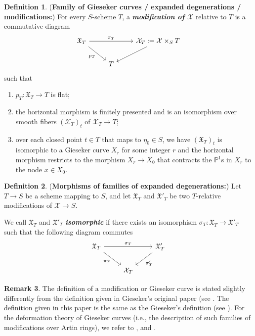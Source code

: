 \documentclass[11pt]{amsart}
\theoremstyle{plain}
\numberwithin{equation}{section}
\theoremstyle{definition}
\newtheorem{Def}{Definition}[section]
\newtheorem{Rem}[Def]{Remark}
\theoremstyle{plain}
\begin{document}
\begin{Def}(\textbf{Family of Gieseker curves / expanded degenerations / modifications:\cite[Definition 3.4]{2a}}) \label{gis120} For every $S$-scheme $T$, a \emph{\bfseries modification of $\mathcal{X}$} relative to $T$  is a commutative diagram
\begin{equation}
\begin{tikzcd}
\mathfrak X_T\arrow{dr}[swap]{p_T}\arrow{rr}{\pi_T}&& \mathcal X_T:=\mathcal X\times_S T\arrow{dl}\\
& T
\end{tikzcd}
\end{equation}
such that
\begin{enumerate}
\item $p_T : \mathfrak X_T \longrightarrow T$ is flat;
\item the horizontal morphism is finitely presented and  is an isomorphism over smooth  fibers $(\mathcal X_T )_t$ of $\mathcal{X}_{T} \to T$;
\item over each closed point $t\in T$ that maps to  $\eta_0\in S$, we have $(\mathfrak X_T)_t$ is isomorphic to a Gieseker curve $X_r$ for some integer $r$ and the horizontal morphism restricts to the morphism $X_{r} \to X_{0}$ that contracts the $\mathbb P^1$s in  $X_r$ to the node $x \in X_{0}$.
\end{enumerate}
\end{Def}

\smallskip

\begin{Def}(\textbf{Morphisms of families of expanded degenerations:})
Let $T \to S$ be a scheme mapping to $S$, and let $\mathfrak X_T$ and ${\mathfrak{X}'}_{T}$ be two $T$-relative  modifications of $\mathcal{X} \to S$.

We call $\mathfrak X_T$ and $\mathfrak X'_T$ \emph{\bfseries isomorphic} if there exists an isomorphism $\sigma_T: \mathfrak X_T\longrightarrow \mathfrak X'_T$ such that the following diagram commutes
\begin{equation}
\begin{tikzcd}
\mathfrak X_T\arrow{dr}[swap]{\pi_T} \arrow{rr}{\sigma_T} && \mathfrak X'_T\arrow{dl}{\pi'_T}\\
& \mathcal X_T
\end{tikzcd}
\end{equation}
\end{Def}

\smallskip

\begin{Rem}
The definition of a modification or Gieseker curve is stated slightly differently from the definition given in Gieseker's original paper (see \cite[(i) and (iii) of the first paragraph of \S 4]{12}. The definition given in this paper is the same as the Gieseker's definition (see \cite[(ii) of Definition 7; Lemma. on page 200]{25}). For the deformation theory of Gieseker curves (i.e., the description of such families of modifications over Artin rings), we refer to \cite[Proposition 4.5. ]{12}, and \cite[Local Theory, Page 197]{25}. 
\end{Rem}
\end{document}
